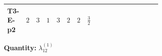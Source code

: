 \documentclass[8pt]{article}
\begin{document}
\begin{landscape}
\begin{longtable}{@{}llcccccc >{\raggedright\arraybackslash}p{0.21\linewidth} >{\raggedright\arraybackslash}p{0.21\linewidth} >{\raggedright\arraybackslash}p{0.21\linewidth}@{}}
\midrule
T3-E-p2 & $2$ & $3$ & $1$ & $3$ & $2$ & $2$ & $\frac{3}{2}$ & \scriptsize\adjustbox{max width=\linewidth}{$\begin{gathered} +16 {\lambda_{12}^{(A)}}^2\end{gathered}$} & \scriptsize\adjustbox{max width=\linewidth}{$\begin{gathered} +\frac{32 {\lambda_{12}^{(\times)}}^2}{3}\end{gathered}$} & \scriptsize\adjustbox{max width=\linewidth}{$\begin{gathered} +\frac{8 {\lambda_{12}^{(\times)}} {\lambda_{S_1}^{(A)}}}{3}\end{gathered}$} \\
\midrule
\bottomrule
\end{longtable}
\clearpage
\noindent\textbf{Quantity: }$\lambda_{12}^{(1)}$\par\smallskip

\end{landscape}
\end{document}
